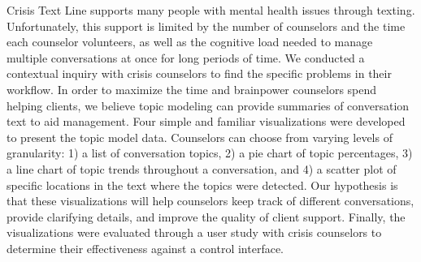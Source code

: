 % 
% 
%
Crisis Text Line supports many people with mental health issues through texting. Unfortunately, this support is limited by the number of counselors and the time each counselor volunteers, as well as the cognitive load needed to manage multiple conversations at once for long periods of time. We conducted a contextual inquiry with crisis counselors to find the specific problems in their workflow. In order to maximize the time and brainpower counselors spend helping clients, we believe topic modeling can provide summaries of conversation text to aid management. Four simple and familiar visualizations were developed to present the topic model data. Counselors can choose from varying levels of granularity: 1) a list of conversation topics, 2) a pie chart of topic percentages, 3) a line chart of topic trends throughout a conversation, and 4) a scatter plot of specific locations in the text where the topics were detected. Our hypothesis is that these visualizations will help counselors keep track of different conversations, provide clarifying details, and improve the quality of client support. Finally, the visualizations were evaluated through a user study with crisis counselors to determine their effectiveness against a control interface.
